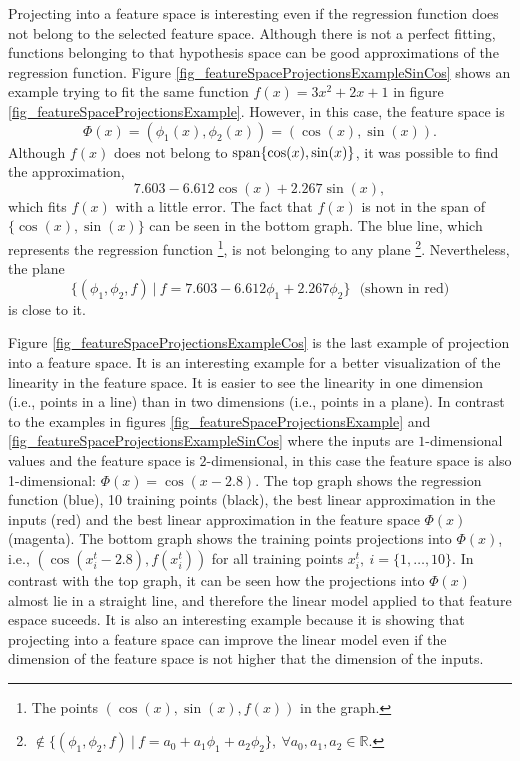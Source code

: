 \begin{example}
Projecting into a feature space is interesting even if the regression function does not belong to the selected feature space. Although there is not a perfect fitting, functions belonging to that hypothesis space can be good approximations of the regression function. Figure \ref{fig_featureSpaceProjectionsExampleSinCos} shows an example trying to fit the same function $f(x) = 3x^2+2x+1$ in figure \ref{fig_featureSpaceProjectionsExample}. However, in this case, the feature space is
\begin{equation*}
  \Phi(x) = (\phi_1(x),\phi_2(x)) = (\cos(x),\sin(x)).
\end{equation*}
Although $f(x)$ does not belong to $\textup{span}\{\cos(x),\sin(x)\}$, it was possible to find the approximation, 
\begin{equation*}
  7.603 - 6.612\cos(x) + 2.267\sin(x),
\end{equation*}
which fits $f(x)$ with a little error. The fact that $f(x)$ is not in the span of $\{\cos(x),\sin(x)\}$ can be seen in the bottom graph. The blue line, which represents the regression function 
\footnote{The points $(\cos(x),\sin(x),f(x))$ in the graph.},
is not belonging to any plane 
\footnote{$\notin \{(\phi_1,\phi_2,f) \ | \ f = a_0 + a_1 \phi_1 + a_2 \phi_2\}, \ \forall a_0,a_1,a_2 \in \mathbb{R}$.}.
Nevertheless, the plane
\begin{equation*}
  \{(\phi_1,\phi_2,f) \ | \ f = 7.603 - 6.612\phi_1 + 2.267\phi_2\} \ \ \ \text{(shown in red)}
\end{equation*} 
is close to it.
\end{example}

\begin{example}
Figure \ref{fig_featureSpaceProjectionsExampleCos} is the last example of projection into a feature space. It is an interesting example for a better visualization of the linearity in the feature space. It is easier to see the linearity in one dimension (i.e., points in a line) than in two dimensions (i.e., points in a plane). In contrast to the examples in figures \ref{fig_featureSpaceProjectionsExample} and \ref{fig_featureSpaceProjectionsExampleSinCos} where the inputs are $1$\hyp{}dimensional values and the feature space is $2$\hyp{}dimensional, in this case the feature space is also 1\hyp{}dimensional: $\Phi(x) = \cos(x-2.8)$. The top graph shows the regression function (blue), 10 training points (black), the best linear approximation in the inputs (red) and the best linear approximation in the feature space $\Phi(x)$ (magenta). The bottom graph shows the training points projections into $\Phi(x)$, i.e., $(\cos(x_i^t-2.8),f(x_i^t))$ for all training points $x_i^t, \ i=\{1,\dots,10\}$. In contrast with the top graph, it can be seen how the projections into $\Phi(x)$ almost lie in a straight line, and therefore the linear model applied to that feature espace suceeds. It is also an interesting example because it is showing that projecting into a feature space can improve the linear model even if the dimension of the feature space is not higher that the dimension of the inputs.
\end{example}

